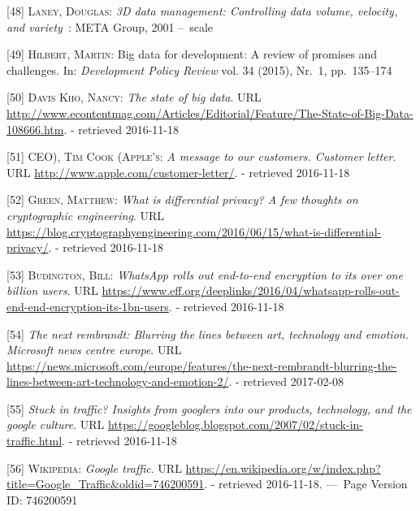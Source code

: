 \documentclass[12pt,english,a4paper,titlepage,cleardoublepage=empty,dottedtoc]{report}
\begin{document}
\hypertarget{ref-report_2001_3d-data-management-controlling-data-volume-velocity-and-variety}{}
{[}48{]} \textsc{Laney, Douglas}: \emph{3D data management: Controlling
data volume, velocity, and variety}~: META Group, 2001 --~scale

\hypertarget{ref-paper_2015_big-data-for-development-a-review-of-promises-and-challenges:more-data}{}
{[}49{]} \textsc{Hilbert, Martin}: Big data for development: A review of
promises and challenges. In: \emph{Development Policy Review} vol. 34
(2015), Nr.~1, pp.~135--174

\hypertarget{ref-web_2016_the-state-of-big-data}{}
{[}50{]} \textsc{Davis Kho, Nancy}: \emph{The state of big data}. URL
\url{http://www.econtentmag.com/Articles/Editorial/Feature/The-State-of-Big-Data-108666.htm}.
- retrieved 2016-11-18

\hypertarget{ref-web_2016_apple_customer-letter}{}
{[}51{]} \textsc{CEO), Tim Cook (Apple's}: \emph{A message to our
customers. Customer letter}. URL
\url{http://www.apple.com/customer-letter/}. - retrieved 2016-11-18

\hypertarget{ref-web_2016_what-is-differential-privacy}{}
{[}52{]} \textsc{Green, Matthew}: \emph{What is differential privacy? A
few thoughts on cryptographic engineering}. URL
\url{https://blog.cryptographyengineering.com/2016/06/15/what-is-differential-privacy/}.
- retrieved 2016-11-18

\hypertarget{ref-web_2016_eff_whatsapp-rolls-out-emd-to-end-encryption}{}
{[}53{]} \textsc{Budington, Bill}: \emph{WhatsApp rolls out end-to-end
encryption to its over one billion users}. URL
\url{https://www.eff.org/deeplinks/2016/04/whatsapp-rolls-out-end-end-encryption-its-1bn-users}.
- retrieved 2016-11-18

\hypertarget{ref-web_2016_research-experiment_ai-rembrandt}{}
{[}54{]} \emph{The next rembrandt: Blurring the lines between art,
technology and emotion. Microsoft news centre europe}. URL
\url{https://news.microsoft.com/europe/features/the-next-rembrandt-blurring-the-lines-between-art-technology-and-emotion-2/}.
- retrieved 2017-02-08

\hypertarget{ref-web_2007_introducing-google-traffic}{}
{[}55{]} \emph{Stuck in traffic? Insights from googlers into our
products, technology, and the google culture}. URL
\url{https://googleblog.blogspot.com/2007/02/stuck-in-traffic.html}. -
retrieved 2016-11-18

\hypertarget{ref-web_2016_wikipedia_google-traffic}{}
{[}56{]} \textsc{Wikipedia}: \emph{Google traffic}. URL
\url{https://en.wikipedia.org/w/index.php?title=Google_Traffic\&oldid=746200591}.
- retrieved 2016-11-18. ---~Page Version ID: 746200591
\end{document}
